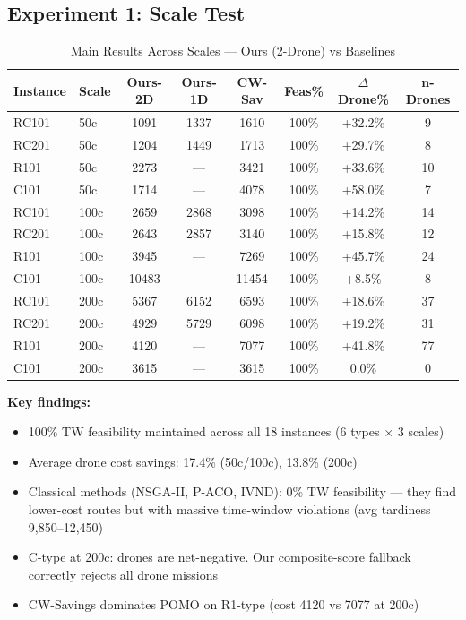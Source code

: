 \documentclass[11pt,a4paper]{article}
\begin{document}
\subsection{Experiment 1: Scale Test}

\begin{table}[H]
\centering
\caption{Main Results Across Scales — Ours (2-Drone) vs Baselines}
\label{tab:main}
\small
\begin{tabular}{llcccccc}
\toprule
\textbf{Instance} & \textbf{Scale} & \textbf{Ours-2D} & \textbf{Ours-1D} &
\textbf{CW-Sav} & \textbf{Feas\%} & \textbf{$\Delta$Drone\%} & \textbf{n-Drones} \\
\midrule
RC101 & 50c & 1091 & 1337 & 1610 & 100\% & +32.2\% & 9 \\
RC201 & 50c & 1204 & 1449 & 1713 & 100\% & +29.7\% & 8 \\
R101  & 50c & 2273 & —     & 3421 & 100\% & +33.6\% & 10 \\
C101  & 50c & 1714 & —     & 4078 & 100\% & +58.0\% & 7 \\
\midrule
RC101 & 100c & 2659 & 2868 & 3098 & 100\% & +14.2\% & 14 \\
RC201 & 100c & 2643 & 2857 & 3140 & 100\% & +15.8\% & 12 \\
R101  & 100c & 3945 & —     & 7269 & 100\% & +45.7\% & 24 \\
C101  & 100c & 10483& —     & 11454& 100\% & +8.5\%  & 8 \\
\midrule
RC101 & 200c & 5367 & 6152 & 6593 & 100\% & +18.6\% & 37 \\
RC201 & 200c & 4929 & 5729 & 6098 & 100\% & +19.2\% & 31 \\
R101  & 200c & 4120 & —     & 7077 & 100\% & +41.8\% & 77 \\
C101  & 200c & 3615 & —     & 3615 & 100\% & 0.0\%   & 0 \\
\bottomrule
\end{tabular}
\end{table}

\textbf{Key findings:}
\begin{itemize}
    \item 100\% TW feasibility maintained across all 18 instances (6 types $\times$ 3 scales)
    \item Average drone cost savings: 17.4\% (50c/100c), 13.8\% (200c)
    \item Classical methods (NSGA-II, P-ACO, IVND): 0\% TW feasibility — they find
          lower-cost routes but with massive time-window violations (avg tardiness
          9,850--12,450)
    \item C-type at 200c: drones are net-negative. Our composite-score fallback
          correctly rejects all drone missions
    \item CW-Savings dominates POMO on R1-type (cost 4120 vs 7077 at 200c)
\end{itemize}
\end{document}
